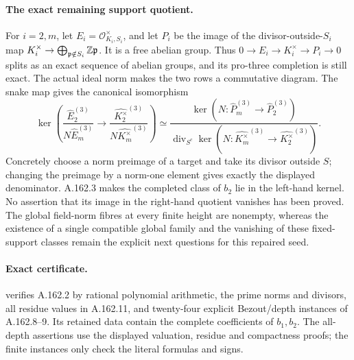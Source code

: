 \paragraph{The exact remaining support quotient.}
For \(i=2,m\), let \(E_i=\mathcal O_{K_i,S_i}^\times\), and let
\(P_i\) be the image of the divisor-outside-\(S_i\) map
\(K_i^\times\to\bigoplus_{\mathfrak p\notin S_i}\mathbb Z\mathfrak p\).
It is a free abelian group.  Thus
\(0\to E_i\to K_i^\times\to P_i\to0\) splits as an exact sequence
of abelian groups, and its pro-three completion is still exact.
The actual ideal norm makes the two rows a commutative diagram.
The snake map gives the canonical isomorphism
\[
 \ker\left(
 \frac{\widehat E_2^{(3)}}{N\widehat E_m^{(3)}}
 \longrightarrow
 \frac{\widehat{K_2^\times}^{(3)}}{N\widehat{K_m^\times}^{(3)}}\right)
 \simeq
 \frac{\ker(N:\widehat P_m^{(3)}\to\widehat P_2^{(3)})}
 {\operatorname{div}_{S^c}\ker
       (N:\widehat{K_m^\times}^{(3)}\to\widehat{K_2^\times}^{(3)})}.
\tag{A.162.16}
\]
Concretely choose a norm preimage of a target and take its divisor
outside \(S\); changing the preimage by a norm-one element gives
exactly the displayed denominator.  A.162.3 makes the completed class
of \(b_2\) lie in the left-hand kernel.  No assertion that its image
in the right-hand quotient vanishes has been proved.
The global field-norm fibres at every finite height are nonempty,
whereas the existence of a single compatible global family and the
vanishing of these fixed-support classes remain the explicit next
questions for this repaired seed.

\paragraph{Exact certificate.}
verifies A.162.2 by rational polynomial arithmetic, the prime norms and
divisors, all residue values in A.162.11, and twenty-four explicit
Bezout/depth instances of A.162.8--9.  Its retained data contain the
complete coefficients of \(b_1,b_2\).  The all-depth assertions use
the displayed valuation, residue and compactness proofs; the finite
instances only check the literal formulas and signs.
